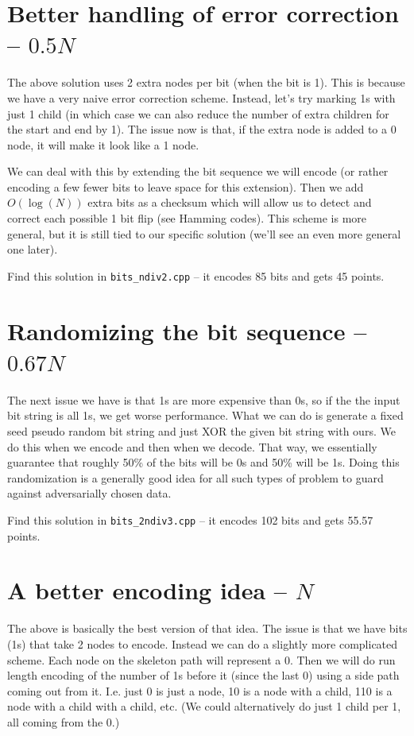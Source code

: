 \documentclass[12pt]{article}
\begin{document}
\section*{Better handling of error correction -- $0.5 N$}

The above solution uses 2 extra nodes per bit (when the bit is 1). This is because we have a very naive error correction scheme. Instead, let's try marking 1s with just 1 child (in which case we can also reduce the number of extra children for the start and end by 1). The issue now is that, if the extra node is added to a 0 node, it will make it look like a 1 node.

We can deal with this by extending the bit sequence we will encode (or rather encoding a few fewer bits to leave space for this extension). Then we add $O(\log (N))$ extra bits as a checksum which will allow us to detect and correct each possible 1 bit flip (see Hamming codes). This scheme is more general, but it is still tied to our specific solution (we'll see an even more general one later).

Find this solution in \verb|bits_ndiv2.cpp| -- it encodes 85 bits and gets 45 points.

\section*{Randomizing the bit sequence -- $0.67 N$}

The next issue we have is that 1s are more expensive than 0s, so if the the input bit string is all 1s, we get worse performance. What we can do is generate a fixed seed pseudo random bit string and just XOR the given bit string with ours. We do this when we encode and then when we decode. That way, we essentially guarantee that roughly 50\% of the bits will be 0s and 50\% will be 1s. Doing this randomization is a generally good idea for all such types of problem to guard against adversarially chosen data.

Find this solution in \verb|bits_2ndiv3.cpp| -- it encodes 102 bits and gets 55.57 points.

\section*{A better encoding idea -- $N$}

The above is basically the best version of that idea. The issue is that we have bits (1s) that take 2 nodes to encode. Instead we can do a slightly more complicated scheme. Each node on the skeleton path will represent a 0. Then we will do run length encoding of the number of 1s before it (since the last 0) using a side path coming out from it. I.e. just 0 is just a node, 10 is a node with a child, 110 is a node with a child with a child, etc. (We could alternatively do just 1 child per 1, all coming from the 0.)
\end{document}
